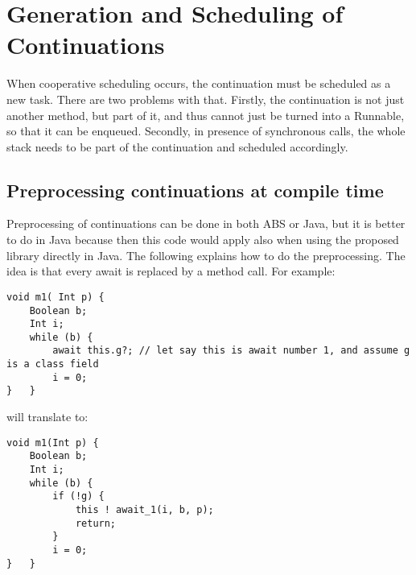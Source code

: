 \section{Generation and Scheduling of Continuations}
\label{comp}

When cooperative scheduling occurs, the continuation must be scheduled as a new task. There are two problems with that. Firstly, the continuation is not just another method, but part of it, and thus cannot just be turned into a Runnable, so that it can be enqueued. Secondly, in presence of synchronous calls, the whole stack needs to be part of the continuation and scheduled accordingly. 


\subsection{Preprocessing continuations at compile time}
Preprocessing of continuations can be done in both ABS or Java, but it is better to do in Java because then this code would apply also when using the proposed library directly in Java. The following explains how to do the preprocessing. The idea is that every await is replaced by a method call. For example:

\begin{lstlisting}
void m1( Int p) {
	Boolean b;
	Int i;
	while (b) {
		await this.g?; // let say this is await number 1, and assume g is a class field
		i = 0;
}	}
\end{lstlisting}

will translate to:
\begin{lstlisting}
void m1(Int p) {
	Boolean b;
	Int i;
	while (b) { 
		if (!g) {
			this ! await_1(i, b, p); 
			return;
		}
		i = 0;
}	}
\end{lstlisting}

